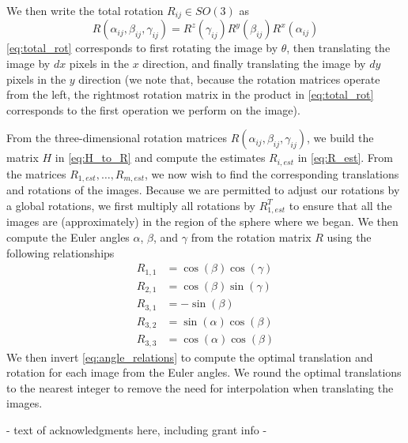 \documentclass{pnastwo}
\begin{document}
\begin{article}
\begin{materials}
%
We then write the total rotation $R_{ij} \in SO(3)$ as 
\begin{equation} \label{eq:total_rot}
	R(\alpha_{ij}, \beta_{ij}, \gamma_{ij})	 = R^z(\gamma_{ij})  R^y(\beta_{ij})  R^x(\alpha_{ij})
\end{equation}
%
\eqref{eq:total_rot} corresponds to first rotating the image by $\theta$, then translating the image by $dx$ pixels in the $x$ direction, and finally translating the image by $dy$ pixels in the $y$ direction (we note that, because the rotation matrices operate from the left, the rightmost rotation matrix in the product in \eqref{eq:total_rot} corresponds to the first operation we perform on the image).

From the three-dimensional rotation matrices $R(\alpha_{ij}, \beta_{ij}, \gamma_{ij})$,
we build the matrix $H$ in \eqref{eq:H_to_R} and compute the estimates $R_{i, est}$ in \eqref{eq:R_est}.
%
From the matrices $R_{1, est}, \dots, R_{m, est}$, we now wish to find the corresponding translations and rotations of the images.
%
Because we are permitted to adjust our rotations by a global rotations, we first multiply all rotations by $R_{1, est}^T$ to ensure that all the images are (approximately) in the region of the sphere where we began.
%
We then compute the Euler angles $\alpha$, $\beta$, and $\gamma$ from the rotation matrix $R$ using the following relationships
\begin{equation}
\begin{aligned}
R_{1,1} & = \cos(\beta)\cos(\gamma) \\
R_{2,1} & = \cos(\beta)\sin(\gamma) \\
R_{3,1} & = -\sin(\beta) \\
R_{3,2} & = \sin(\alpha)\cos(\beta) \\
R_{3,3} & = \cos(\alpha)\cos(\beta) 
\end{aligned}
\end{equation}
%
We then invert \eqref{eq:angle_relations} to compute the optimal translation and rotation for each image from the Euler angles.
%
We round the optimal translations to the nearest integer to remove the need for interpolation when translating the images.  
\end{materials}




\begin{acknowledgments}
- text of acknowledgments here, including grant info -
\end{acknowledgments}


\end{article}
\end{document}

